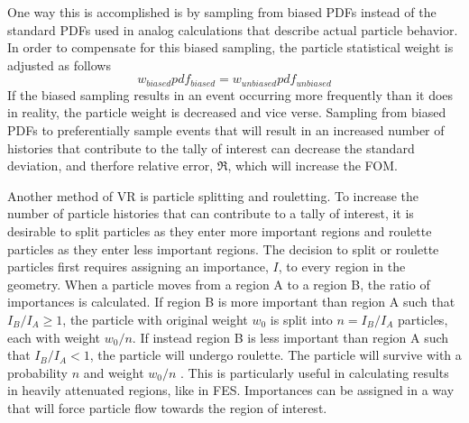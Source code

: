 One way this is accomplished is by sampling from biased PDFs instead of the
standard PDFs used in analog calculations that describe actual particle behavior.
In order to compensate for this biased sampling, the particle statistical weight
is adjusted as follows \cite{cadis}
\begin{equation} \label{eq:2.1}
		w_{biased} pdf_{biased} = w_{unbiased} pdf_{unbiased}
\end{equation}
If the biased sampling results in an event occurring more frequently than it
does in reality,
the particle weight is decreased and vice verse.  Sampling from biased PDFs 
to preferentially sample events that will result in an increased number of histories that
contribute to the tally of interest 
can decrease the standard deviation, and
therfore relative error, $\Re$, which will increase the FOM.

Another method of VR is particle splitting
and rouletting.  
To increase the number of particle histories that can contribute to a tally of
interest, it is desirable to split particles as they enter more important 
regions and roulette particles as they enter less important regions. 
The decision to split or roulette particles first requires assigning an 
importance, $I$, to every region in the geometry. 
When a particle moves from a region A to a region B,
the ratio of importances is calculated.  If region B is more important than
region A such that 
$I_{B}/I_{A} \geqslant 1$, 
the particle with original weight $w_{0}$ is split into 
$n = I_{B}/I_{A}$
particles, each with weight $w_{0}/n$.  If instead region B is less important
than region A such that
$I_{B}/I_{A} < 1$, 
the particle will undergo roulette. 
The particle will survive with a probability $n$ and weight $w_{0}/n$
\cite{Carter_Cashwell_1975}.
This is particularly useful in calculating results in heavily attenuated
regions, like in FES.  Importances can be assigned in a way that will force
particle flow towards the region of interest.

